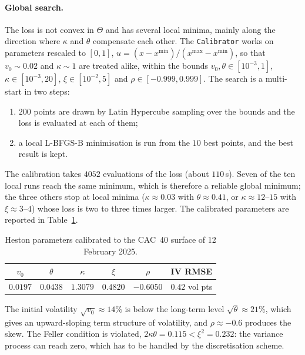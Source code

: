 \documentclass[11pt,a4paper]{article}
\theoremstyle{remark}
\newcommand{\code}[1]{\texttt{#1}}
\begin{document}
\paragraph{Global search.}
The loss is not convex in $\Theta$ and has several local minima, mainly along
the direction where $\kappa$ and $\theta$ compensate each other. The
\code{Calibrator} works on parameters rescaled to $[0,1]$,
$u = (x - x^{\min})/(x^{\max} - x^{\min})$, so that $v_0 \sim 0.02$ and
$\kappa \sim 1$ are treated alike, within the bounds
$v_0, \theta \in [10^{-3}, 1]$, $\kappa \in [10^{-3}, 20]$,
$\xi \in [10^{-2}, 5]$ and $\rho \in [-0.999, 0.999]$. The search is a
multi-start in two steps:
\begin{enumerate}
  \item $200$ points are drawn by Latin Hypercube sampling over the bounds and
        the loss is evaluated at each of them;
  \item a local L-BFGS-B minimisation is run from the $10$ best points, and the
        best result is kept.
\end{enumerate}
The calibration takes $4052$ evaluations of the loss (about $110$\,s). Seven of
the ten local runs reach the same minimum, which is therefore a reliable global
minimum; the three others stop at local minima ($\kappa \approx 0.03$ with
$\theta \approx 0.41$, or $\kappa \approx 12$--$15$ with $\xi \approx 3$--$4$)
whose loss is two to three times larger. The calibrated parameters are
reported in Table~\ref{tab:heston-params}.

\begin{table}[htbp]
\centering
\begin{tabular}{cccccc}
\toprule
$v_0$ & $\theta$ & $\kappa$ & $\xi$ & $\rho$ & IV RMSE \\
\midrule
$0.0197$ & $0.0438$ & $1.3079$ & $0.4820$ & $-0.6050$ & $0.42$ vol pts \\
\bottomrule
\end{tabular}
\caption{Heston parameters calibrated to the CAC~40 surface of 12 February 2025.}
\label{tab:heston-params}
\end{table}

The initial volatility $\sqrt{v_0} \approx 14\%$ is below the long-term level
$\sqrt{\theta} \approx 21\%$, which gives an upward-sloping term structure of
volatility, and $\rho \approx -0.6$ produces the skew. The Feller condition is
violated, $2\kappa\theta = 0.115 < \xi^2 = 0.232$: the variance process can
reach zero, which has to be handled by the discretisation scheme.
\end{document}
